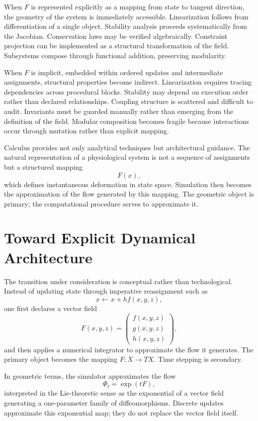\documentclass[12pt]{book}
\begin{document}
When $F$ is represented explicitly as a mapping from state to tangent
direction, the geometry of the system is immediately accessible.
Linearization follows from differentiation of a single object.
Stability analysis proceeds systematically from the Jacobian.
Conservation laws may be verified algebraically. Constraint projection
can be implemented as a structural transformation of the field.
Subsystems compose through functional addition, preserving modularity.

When $F$ is implicit, embedded within ordered updates and
intermediate assignments, structural properties become indirect.
Linearization requires tracing dependencies across procedural blocks.
Stability may depend on execution order rather than declared
relationships. Coupling structure is scattered and difficult to audit.
Invariants must be guarded manually rather than emerging from the
definition of the field. Modular composition becomes fragile because
interactions occur through mutation rather than explicit mapping.

Calculus provides not only analytical techniques but architectural
guidance. The natural representation of a physiological system is not
a sequence of assignments but a structured mapping
\[
F(x),
\]
which defines instantaneous deformation in state space. Simulation
then becomes the approximation of the flow generated by this mapping.
The geometric object is primary; the computational procedure serves
to approximate it.

\section{Toward Explicit Dynamical Architecture}

The transition under consideration is conceptual rather than technological.
Instead of updating state through imperative reassignment such as
\[
x \leftarrow x + h f(x,y,z),
\]
one first declares a vector field
\[
F(x,y,z)
=
\begin{pmatrix}
f(x,y,z) \\
g(x,y,z) \\
h(x,y,z)
\end{pmatrix},
\]
and then applies a numerical integrator to approximate the flow it
generates. The primary object becomes the mapping $F : X \to TX$.
Time stepping is secondary.

In geometric terms, the simulator approximates the flow
\[
\Phi_t = \exp(tF),
\]
interpreted in the Lie-theoretic sense as the exponential of a vector
field generating a one-parameter family of diffeomorphisms.
Discrete updates approximate this exponential map; they do not
replace the vector field itself.
\end{document}

